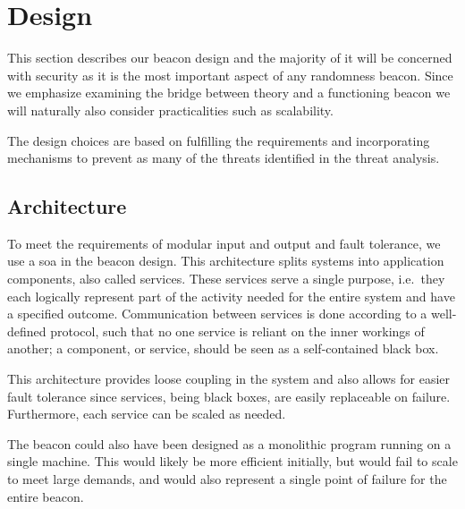 \section{Design}\label{sec:design}

This section describes our beacon design and the majority of it will be concerned with security as it is the most important aspect of any randomness beacon. Since we emphasize examining the bridge between theory and a functioning beacon we will naturally also consider practicalities such as scalability.

The design choices are based on fulfilling the requirements and incorporating mechanisms to prevent as many of the threats identified in the threat analysis.

\subsection{Architecture}\label{sec:design_architecture}
To meet the requirements of modular input and output and fault tolerance, we use a \gls{soa} in the beacon design.
This architecture splits systems into application components, also called services.
These services serve a single purpose, i.e.\ they each logically represent part of the activity needed for the entire system and have a specified outcome.
Communication between services is done according to a well-defined protocol, such that no one service is reliant on the inner workings of another;
a component, or service, should be seen as a self-contained black box.

This architecture provides loose coupling in the system and also allows for easier fault tolerance since services, being black boxes, are easily replaceable on failure.
Furthermore, each service can be scaled as needed.

The beacon could also have been designed as a monolithic program running on a single machine. This would likely be more efficient initially, but would fail to scale to meet large demands, and would also represent a single point of failure for the entire beacon.